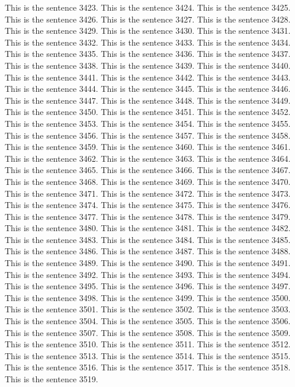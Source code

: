 \documentclass{article}
\begin{document}
This is the sentence 3423.
This is the sentence 3424.
This is the sentence 3425.
This is the sentence 3426.
This is the sentence 3427.
This is the sentence 3428.
This is the sentence 3429.
This is the sentence 3430.
This is the sentence 3431.
This is the sentence 3432.
This is the sentence 3433.
This is the sentence 3434.
This is the sentence 3435.
This is the sentence 3436.
This is the sentence 3437.
This is the sentence 3438.
This is the sentence 3439.
This is the sentence 3440.
This is the sentence 3441.
This is the sentence 3442.
This is the sentence 3443.
This is the sentence 3444.
This is the sentence 3445.
This is the sentence 3446.
This is the sentence 3447.
This is the sentence 3448.
This is the sentence 3449.
This is the sentence 3450.
This is the sentence 3451.
This is the sentence 3452.
This is the sentence 3453.
This is the sentence 3454.
This is the sentence 3455.
This is the sentence 3456.
This is the sentence 3457.
This is the sentence 3458.
This is the sentence 3459.
This is the sentence 3460.
This is the sentence 3461.
This is the sentence 3462.
This is the sentence 3463.
This is the sentence 3464.
This is the sentence 3465.
This is the sentence 3466.
This is the sentence 3467.
This is the sentence 3468.
This is the sentence 3469.
This is the sentence 3470.
This is the sentence 3471.
This is the sentence 3472.
This is the sentence 3473.
This is the sentence 3474.
This is the sentence 3475.
This is the sentence 3476.
This is the sentence 3477.
This is the sentence 3478.
This is the sentence 3479.
This is the sentence 3480.
This is the sentence 3481.
This is the sentence 3482.
This is the sentence 3483.
This is the sentence 3484.
This is the sentence 3485.
This is the sentence 3486.
This is the sentence 3487.
This is the sentence 3488.
This is the sentence 3489.
This is the sentence 3490.
This is the sentence 3491.
This is the sentence 3492.
This is the sentence 3493.
This is the sentence 3494.
This is the sentence 3495.
This is the sentence 3496.
This is the sentence 3497.
This is the sentence 3498.
This is the sentence 3499.
This is the sentence 3500.
This is the sentence 3501.
This is the sentence 3502.
This is the sentence 3503.
This is the sentence 3504.
This is the sentence 3505.
This is the sentence 3506.
This is the sentence 3507.
This is the sentence 3508.
This is the sentence 3509.
This is the sentence 3510.
This is the sentence 3511.
This is the sentence 3512.
This is the sentence 3513.
This is the sentence 3514.
This is the sentence 3515.
This is the sentence 3516.
This is the sentence 3517.
This is the sentence 3518.
This is the sentence 3519.
\end{document}
